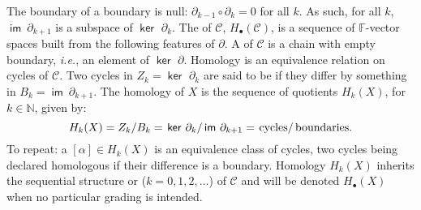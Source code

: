 \documentclass{psapm-l}
\theoremstyle{definition}
\theoremstyle{remark}
\numberwithin{equation}{section}
\begin{document}
The boundary of a boundary is null: ${\partial}_{k-1}\circ{\partial}_{k}=0$ for all $k$. As such, for all $k$, ${{{\operatorname{\mathsf{{im}}}}}}\ {\partial}_{k+1}$ is a subspace of ${{{\operatorname{\mathsf{{ker\ }}}}}}  {\partial}_k$. The {{}} of ${{\mathcal C}}$, $H_{\bullet}({{\mathcal C}})$, is a sequence of ${{\mathbb F}}$-vector spaces built from the following features of ${\partial}$. A {{}} of ${{\mathcal C}}$ is a chain with empty boundary, {{\em i.e.}}, an element of ${{{\operatorname{\mathsf{{ker\ }}}}}}  {\partial}$. Homology is an equivalence relation on cycles of ${{\mathcal C}}$. Two cycles in $Z_k={{{\operatorname{\mathsf{{ker\ }}}}}}  {\partial}_k$ are said to be {{}} if they differ by something in $B_k={{{\operatorname{\mathsf{{im}}}}}}\ {\partial}_{k+1}$. The homology of $X$ is the sequence of quotients $H_k(X)$, for $k\in{{\mathbb N}}$, given by:
\begin{equation}
\label{eq:homology}
    H_k(X) = Z_k/B_k = \left.{{{\operatorname{\mathsf{{ker\ }}}}}}  {\partial}_k\right/{{{\operatorname{\mathsf{{im}}}}}}\ {\partial}_{k+1} = \left.{\mbox{\rm cycles}} \right/{\mbox{\rm boundaries}} .
\end{equation}
To repeat: a {{}} $[\alpha]\in H_k(X)$ is an equivalence class of cycles, two cycles being declared homologous if their difference is a boundary. Homology $H_k(X)$ inherits the sequential structure or {{}} ($k=0,1,2,\ldots$) of ${{\mathcal C}}$ and will be denoted $H_{\bullet}(X)$ when no particular grading is intended.
\end{document}
